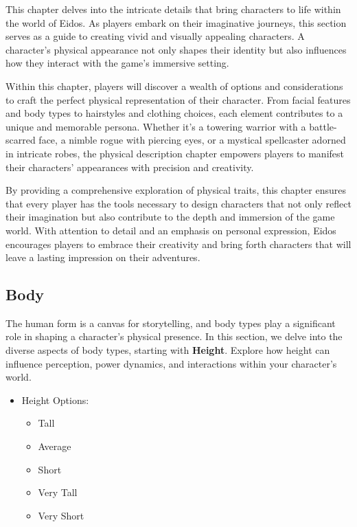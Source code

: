 \documentclass[12pt]{book}  %
\begin{document}
This chapter delves into the intricate details that bring characters to life within the world of Eidos. As players embark on their imaginative journeys, this section serves as a guide to creating vivid and visually appealing characters. A character's physical appearance not only shapes their identity but also influences how they interact with the game's immersive setting.

Within this chapter, players will discover a wealth of options and considerations to craft the perfect physical representation of their character. From facial features and body types to hairstyles and clothing choices, each element contributes to a unique and memorable persona. Whether it's a towering warrior with a battle-scarred face, a nimble rogue with piercing eyes, or a mystical spellcaster adorned in intricate robes, the physical description chapter empowers players to manifest their characters' appearances with precision and creativity.

By providing a comprehensive exploration of physical traits, this chapter ensures that every player has the tools necessary to design characters that not only reflect their imagination but also contribute to the depth and immersion of the game world. With attention to detail and an emphasis on personal expression, Eidos encourages players to embrace their creativity and bring forth characters that will leave a lasting impression on their adventures.

\subsection{\textbf{Body}}

The human form is a canvas for storytelling, and body types play a significant role in shaping a character's physical presence. In this section, we delve into the diverse aspects of body types, starting with \textbf{Height}. Explore how height can influence perception, power dynamics, and interactions within your character's world.

\begin{itemize}
    \item Height Options:
    \begin{itemize}
        \item Tall
        \item Average
        \item Short
        \item Very Tall
        \item Very Short
    \end{itemize}
\end{itemize}
\end{document}
